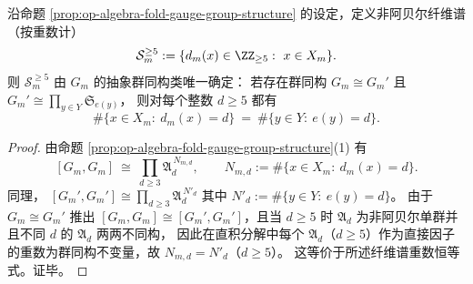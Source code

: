 \begin{corollary}[非阿贝尔纤维谱的抽象刚性：\texorpdfstring{$d\ge 5$}{d>=5} 的重数由群论确定]\label{cor:op-algebra-fold-gauge-nonabelian-spectrum-rigidity}
沿命题 \ref{prop:op-algebra-fold-gauge-group-structure} 的设定，定义非阿贝尔纤维谱（按重数计）
\[
\mathcal S_m^{\ge 5}:=\{d_m(x)\in\ZZ_{\ge 5}:\ x\in X_m\}.
\]
则 \(\mathcal S_m^{\ge 5}\) 由 \(G_m\) 的抽象群同构类唯一确定：
若存在群同构
\(
G_m\cong G_m'
\)
且
\(
G_m'\cong \prod_{y\in Y}\mathfrak S_{e(y)}
\)，
则对每个整数 \(d\ge 5\) 都有
\[
\#\{x\in X_m:\ d_m(x)=d\}\ =\ \#\{y\in Y:\ e(y)=d\}.
\]
\end{corollary}
\begin{proof}
由命题 \ref{prop:op-algebra-fold-gauge-group-structure}(1) 有
\[
[G_m,G_m]\ \cong\ \prod_{d\ge 3}\mathfrak A_d^{\,N_{m,d}},
\qquad
N_{m,d}:=\#\{x\in X_m:\ d_m(x)=d\}.
\]
同理，
\(
[G_m',G_m']\cong \prod_{d\ge 3}\mathfrak A_d^{\,N'_{d}}
\)
其中 \(N'_d:=\#\{y\in Y:\ e(y)=d\}\)。
由于 \(G_m\cong G_m'\) 推出 \([G_m,G_m]\cong [G_m',G_m']\)，且当 \(d\ge 5\) 时 \(\mathfrak A_d\) 为非阿贝尔单群并且不同 \(d\) 的 \(\mathfrak A_d\) 两两不同构，
因此在直积分解中每个 \(\mathfrak A_d\)（\(d\ge 5\)）作为直接因子的重数为群同构不变量，故 \(N_{m,d}=N'_d\)（\(d\ge 5\)）。
这等价于所述纤维谱重数恒等式。证毕。
\end{proof}

\endinput

